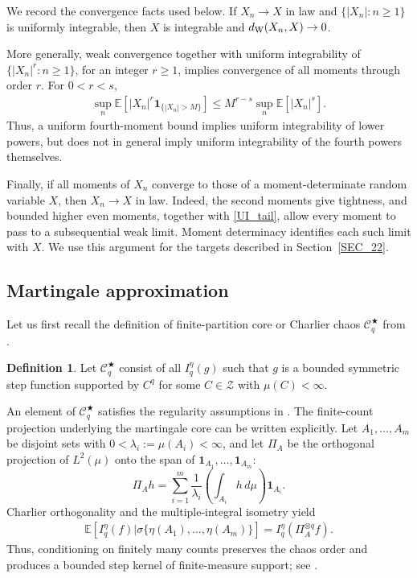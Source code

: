 \documentclass[letterpaper,11pt,reqno]{amsart}
\numberwithin{equation}{section}
\theoremstyle{plain}
\theoremstyle{definition}
\newtheorem{definition}[theorem]{Definition}
\theoremstyle{remark}
\newcommand{\E}{\mathbb{E}}
\newcommand{\ind}{\mathbf{1}}
\newcommand{\cC}{\mathcal{C}}
\newcommand{\sZ}{\mathscr{Z}}
\newcommand{\noi}{\noindent}
\newcommand{\dd}{d}
\newcommand{\dW}{d_{\rm W}}
\newcommand{\s}{\sigma}
\begin{document}
We record the convergence facts used below.  If
$X_n\to X$ in law and $\{|X_n|:n\geq1\}$ is uniformly
integrable, then $X$ is integrable and
$\dW(X_n,X)\to0$.


More generally, weak convergence together with uniform
integrability of $\{|X_n|^r:n\geq1\}$, for an integer
$r\geq1$, implies convergence of all moments through order
$r$.  For $0<r<s$,
\noi
\begin{align}
 \sup_n\E[|X_n|^r\ind_{\{|X_n|>M\}}]
 \leq M^{r-s}\sup_n\E[|X_n|^s].
 \label{UI_tail}
\end{align}
Thus, a uniform fourth-moment bound implies uniform
integrability of lower powers, but does not in general imply
uniform integrability of the fourth powers themselves.

Finally, if all moments of $X_n$ converge to those of a
moment-determinate random variable $X$, then $X_n\to X$ in
law.  Indeed, the second moments give tightness, and bounded
higher even moments, together with \eqref{UI_tail}, allow
every moment to pass to a subsequential weak limit.  Moment
determinacy identifies each such limit with $X$.  We use this
argument for the targets described in Section~\ref{SEC_22}.


\subsection{Martingale approximation}
\label{SEC_23}

Let us first recall the definition of finite-partition core or Charlier chaos  
 $\cC_q^{\bigstar}$ from \cite[Definition 1.6]{Zhe26a}.
 
 \begin{definition}\label{def_CCQ}
Let $\cC_q^{\bigstar}$ consist of all $I_q^\eta(g)$ such that $g$
is a bounded symmetric step function supported by $C^q$ for some
$C\in\sZ$ with $\mu(C)<\infty$. 
\end{definition}
An element of  $\cC_q^{\bigstar}$
satisfies the regularity assumptions in \cite{DP18b}.
The finite-count projection underlying the martingale core can be
written explicitly.  Let $A_1,\ldots,A_m$ be disjoint sets with
$0<\lambda_i:=\mu(A_i)<\infty$, and let $\Pi_A$ be the orthogonal
projection of $L^2(\mu)$ onto the span of
$\ind_{A_1},\ldots,\ind_{A_m}$:
\[
 \Pi_Ah=\sum_{i=1}^m\frac1{\lambda_i}
 \left(\int_{A_i}h\,\dd\mu\right)\ind_{A_i}.
\]
Charlier orthogonality and the multiple-integral isometry yield
\noi
\begin{align}
 \E[I_q^\eta(f) | \s\{\eta(A_1),\ldots,\eta(A_m)\}]
 =I_q^\eta(\Pi_A^{\otimes q}f).
 \label{count_proj}
\end{align}
Thus, conditioning on finitely many counts preserves the chaos order
and produces a bounded step kernel of finite-measure support; see
\cite[Section~2.2]{Zhe26a}.
\end{document}
